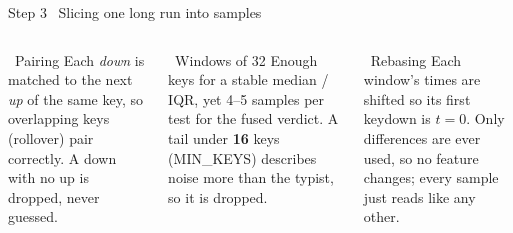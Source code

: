 \documentclass[aspectratio=169,11pt,t]{beamer}
\newcommand\code[1]{{\ttfamily\color{terradk}#1}}
\begin{document}
\begin{frame}{Step 3 \textperiodcentered\ Slicing one long run into samples}
\vspace{3mm}
\begin{columns}[T,onlytextwidth]
\begin{card}[terra]{\faLink\ Pairing}
\scriptsize Each \emph{down} is matched to the next \emph{up} of the same key, so overlapping keys (rollover)
pair correctly. A down with no up is dropped, never guessed.
\end{card}
\begin{card}[sky]{\faCut\ Windows of 32}
\scriptsize Enough keys for a stable median / IQR, yet 4--5 samples per test for the fused verdict.
A tail under \textbf{16} keys (\code{MIN\_KEYS}) describes noise more than the typist, so it is dropped.
\end{card}
\begin{card}[sage]{\faRedo\ Rebasing}
\scriptsize Each window's times are shifted so its first keydown is \(t{=}0\). Only differences are ever used, so no
feature changes; every sample just reads like any other.
\end{card}
\end{columns}
\end{frame}
\end{document}
